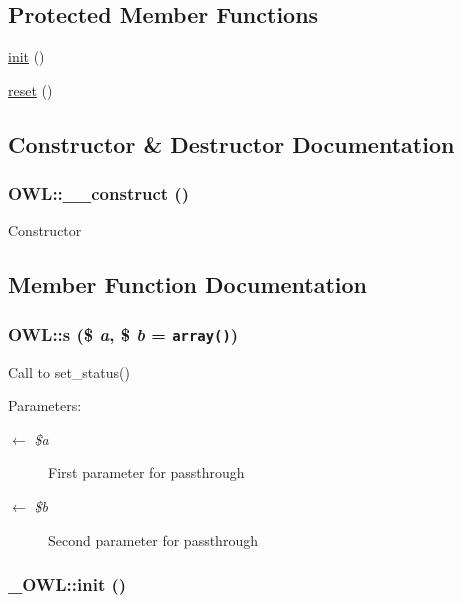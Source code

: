 \subsection*{Protected Member Functions}
\begin{CompactItemize}
\item 
\hyperlink{class__OWL_e0ef3ded56e8a6b34b6461e5a721cd3e}{init} ()
\item 
\hyperlink{class__OWL_2f2a042bcf31965194c03033df0edc9b}{reset} ()
\end{CompactItemize}


\subsection{Constructor \& Destructor Documentation}
\hypertarget{classOWL_9240437570d0787f35b7a1102ee39cc6}{
\subsubsection{\setlength{\rightskip}{0pt plus 5cm}OWL::\_\-\_\-construct ()}}
\label{classOWL_9240437570d0787f35b7a1102ee39cc6}


Constructor 

\subsection{Member Function Documentation}
\hypertarget{classOWL_4adf6bbba0af73025bdf9cfac01242fa}{
\subsubsection{\setlength{\rightskip}{0pt plus 5cm}OWL::s (\$ {\em a}, \$ {\em b} = {\tt array()})}}
\label{classOWL_4adf6bbba0af73025bdf9cfac01242fa}


Call to set\_\-status() \begin{Desc}
\item[Parameters:]
\begin{description}
\item[\mbox{$\leftarrow$} {\em \$a}]First parameter for passthrough \item[\mbox{$\leftarrow$} {\em \$b}]Second parameter for passthrough \end{description}
\end{Desc}
\hypertarget{class__OWL_e0ef3ded56e8a6b34b6461e5a721cd3e}{
\subsubsection{\setlength{\rightskip}{0pt plus 5cm}\_\-OWL::init ()}}
\label{class__OWL_e0ef3ded56e8a6b34b6461e5a721cd3e}


